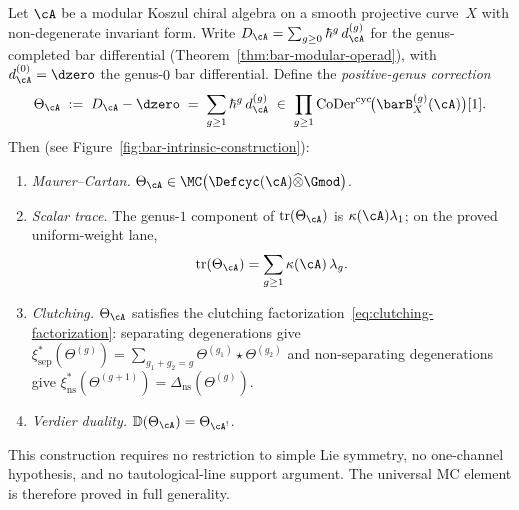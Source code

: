 \begin{theorem}
\label{thm:mc2-bar-intrinsic}
Let $\cA$ be a modular Koszul chiral algebra on a smooth
projective curve~$X$ with non-degenerate invariant form.
Write
$D_\cA = \sum_{g \geq 0} \hbar^g\, d_\cA^{(g)}$
for the genus-completed bar differential
\textup{(}Theorem~\textup{\ref{thm:bar-modular-operad}}\textup{)},
with $d_\cA^{(0)} = \dzero$ the genus-$0$ bar differential.
Define the \emph{positive-genus correction}
\begin{equation}\label{eq:theta-bar-intrinsic}
\Theta_\cA
\;:=\;
D_\cA - \dzero
\;=\;
\sum_{g \geq 1} \hbar^g\, d_\cA^{(g)}
\;\in\;
\prod_{g \geq 1}
\operatorname{CoDer}^{\mathrm{cyc}}\!\bigl(
  \barB^{(g)}_X(\cA)
\bigr)[1].
\end{equation}
Then \textup{(}see Figure~\textup{\ref{fig:bar-intrinsic-construction})}:
\begin{enumerate}[label=\textup{(\roman*)}]
\item \emph{Maurer--Cartan.}
  $\Theta_\cA \in
  \MC\bigl(\Defcyc(\cA) \widehat{\otimes} \Gmod\bigr)$.
\item \emph{Scalar trace.}
  The genus-$1$ component of $\operatorname{tr}(\Theta_\cA)$ is
  $\kappa(\cA)\lambda_1$; on the proved uniform-weight lane,
  \[
    \operatorname{tr}(\Theta_\cA)
    = \sum_{g \geq 1} \kappa(\cA)\,\lambda_g .
  \]
\item \emph{Clutching.}
  $\Theta_\cA$ satisfies the clutching
  factorization~\eqref{eq:clutching-factorization}: separating
  degenerations give
  $\xi_{\mathrm{sep}}^*(\Theta^{(g)})
  = \sum_{g_1+g_2=g}
  \Theta^{(g_1)} \star \Theta^{(g_2)}$
  and non-separating degenerations give
  $\xi_{\mathrm{ns}}^*(\Theta^{(g+1)})
  = \Delta_{\mathrm{ns}}(\Theta^{(g)})$.
\item \emph{Verdier duality.}
  $\mathbb{D}(\Theta_\cA) = \Theta_{\cA^!}$.
\end{enumerate}
This construction requires no restriction to simple Lie symmetry,
no one-channel hypothesis, and no tautological-line support
argument.  The universal MC element is therefore proved in full
generality.
\end{theorem}

